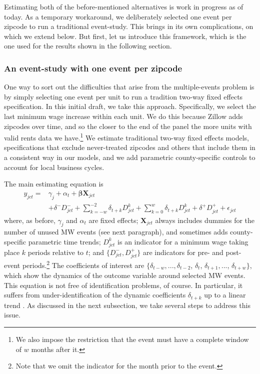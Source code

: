     Estimating both of the before-mentioned alternatives is work in progress as of today. As a temporary workaround, we deliberately selected one event per zipcode to run a traditional event-study. This brings in its own complications, on which we extend below. But first, let us introduce this framework, which is the one used for the results shown in the following section.

\subsubsection{An event-study with one event per zipcode}

    One way to sort out the difficulties that arise from the multiple-events problem is by simply selecting one event per unit to run a tradition two-way fixed effects specification. In this initial draft, we take this approach. Specifically, we select the last minimum wage increase within each unit. We do this because Zillow adds zipcodes over time, and so the closer to the end of the panel the more units with valid rents data we have.\footnote{We also impose the restriction that the event must have a complete window of $w$ months after it.} We estimate traditional two-way fixed effects models, specifications that exclude never-treated zipcodes and others that include them in a consistent way in our models, and we add parametric county-specific controls to account for local business cycles. 

    The main estimating equation is
    \begin{equation}\label{eq:last-event-study}
        \begin{split}
            y_{jct} = & \gamma_{j} + \alpha_{t} + \boldsymbol{\beta} \boldsymbol{X}_{jct} \\
            & + \delta^{-} D_{jct}^{-} + \sum\limits_{k = -w}^{-2}\delta_{t + k}D_{jct}^k + \sum\limits_{k = 0}^{w}\delta_{t + k} D_{jct}^k + \delta^{+} D_{jct}^{+} + \epsilon_{jct} 
        \end{split}   
    \end{equation}
    where, as before, $\gamma_{j}$ and $\alpha_{t}$ are fixed effects; $\boldsymbol{X}_{jct}$ always includes dummies for the number of unused MW events (see next paragraph), and sometimes adds county-specific parametric time trends; $D_{jct}^k$ is an indicator for a minimum wage taking place $k$ periods relative to $t$; and $\{D_{jct}^{-}, D_{jct}^{+}\}$ are indicators for pre- and post-event periods.\footnote{Note that we omit the indicator for the month prior to the event.} The coefficients of interest are $\{\delta_{t-w}, ..., \delta_{t-2}$, $\delta_t$, $\delta_{t+1}, ...$, $\delta_{t+w}\}$, which show the dynamics of the outcome variable around selected MW events. This equation is not free of identification problems, of course. In particular, it suffers from under-identification of the dynamic coefficients $\delta_{t+k}$ up to a linear trend \parencite{BorusyakJaravel2017}. As discussed in the next subsection, we take several steps to address this issue.
    
